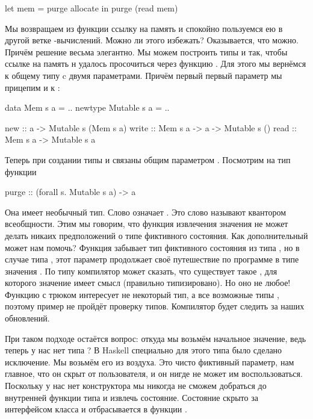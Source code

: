 \begin{code}
let mem = purge allocate
in  purge (read mem)
\end{code}

Мы возвращаем из функции  ссылку на память
и спокойно пользуемся ею в другой ветке -вычислений.
Можно ли этого избежать? Оказывается, что можно. 
Причём решение весьма элегантно. Мы можем построить типы
 и  так, чтобы ссылке на память н удалось
просочиться через функцию . Для этого мы вернёмся
к общему типу  c двумя параметрами. Причём
первый первый параметр мы прицепим и к :

\begin{code}
data    Mem     s a = ..
newtype Mutable s a = ..

new     :: a -> Mutable s (Mem s a)
write   :: Mem s a -> a -> Mutable s ()
read    :: Mem s a -> Mutable s a
\end{code}

Теперь при создании типы  и  связаны общим
параметром . Посмотрим на тип функции 

\begin{code}
purge :: (forall s. Mutable s a) -> a
\end{code}

Она имеет необычный тип. Слово  
означает . Это слово называют квантором
всеобщности. Этим мы говорим, что функция извлечения
значения не может делать никаих предположений о типе 
фиктивного состояния. 
Как дополнительный  может нам помочь? 
Функция  забывает тип фиктивного состояния 
из типа , но в случае типа , этот параметр
продолжает своё путешествие по программе в типе значения 
.
По типу  компилятор может сказать, что существует
такое , для которого значение  имеет смысл
(правильно типизировано). Но оно не любое! Функцию 
с трюком интересует не некоторый тип, а все возможные типы ,
поэтому пример не пройдёт проверку типов. Компилятор будет следить
за  наших обновлений.

При таком подходе остаётся вопрос: откуда мы возьмём начальное
значение, ведь теперь у нас нет типа ? 
В Haskell специально для этого типа было сделано исключение.
Мы возьмём его из воздуха. Это чисто фиктивный параметр, нам главное,
что он скрыт от пользователя, и он нигде не может им воспользоваться.
Поскольку у нас нет конструктора  мы никогда не сможем
добраться до внутренней функции типа  и извлечь состояние.
Состояние скрыто за интерфейсом класса  и 
отбрасывается в функции .


